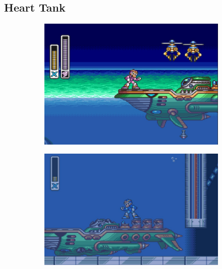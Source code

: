 \subsection{Heart Tank}
\begin{figure}[h]
	\centering
	\begin{subfigure}{0.4\textwidth}
		\centering
		\includegraphics[width=\linewidth]{figures/X1/Octopus_heart_1.jpg}
		\caption{}
	\end{subfigure}
	\begin{subfigure}{0.4\textwidth}
		\centering
		\includegraphics[width=\linewidth]{figures/X1/Octopus_heart_2.jpg}
		\caption{}
	\end{subfigure}\\
	\begin{subfigure}{0.4\textwidth}
		\centering

\end{subfigure}
\end{figure}
